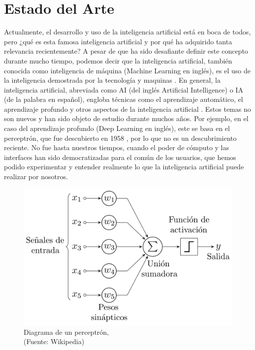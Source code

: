 
\chapter{Estado del Arte}


\par Actualmente, el desarrollo y uso de la inteligencia artificial está en boca de todos, pero ¿qué es esta famosa 
inteligencia artificial y por qué ha adquirido tanta relevancia recientemente? A pesar de que ha sido desafiante
definir este concepto durante mucho tiempo, podemos decir que la inteligencia artificial, también conocida 
como inteligencia de máquina (Machine Learning en inglés), es el uso de la inteligencia demostrada por la 
tecnología y maquinas \cite{mt1}. En general, la inteligencia artificial, abreviada como AI (del inglés Artificial Intelligence) 
o IA (de la palabra en español), engloba técnicas como el aprendizaje automático, el aprendizaje profundo y
otros aspectos de la inteligencia artificial \cite{mt1}. Estos temas no son nuevos y han sido objeto de estudio durante 
muchos años. Por ejemplo, en el caso del aprendizaje profundo (Deep Learning en inglés), este se basa en el 
perceptrón, que fue descubierto en 1958 \cite{perceptron}, por lo que no es un descubrimiento reciente. No fue hasta nuestros tiempos, cuando el poder de cómputo y las interfaces 
han sido democratizadas para el común de los usuarios, que hemos podido experimentar y entender realmente lo que la 
inteligencia artificial puede realizar por nosotros.\\


\begin{figure}[ht!]
    \centering
    \includegraphics[width=.75\textwidth]{figures/ea1.png}
    \caption[Estructura del perceptrón]{Diagrama de un perceptrón,\\
    {\scriptsize (Fuente: Wikipedia)}}
    \label{fig:ea1}
\end{figure}

